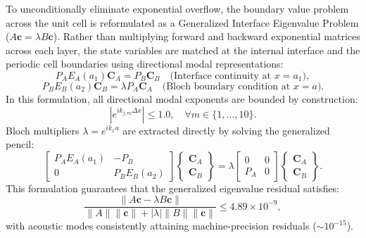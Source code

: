 \documentclass[11pt,a4paper]{article}
\begin{document}
To unconditionally eliminate exponential overflow, the boundary value problem across the unit cell is reformulated as a Generalized Interface Eigenvalue Problem ($A\mathbf{c} = \lambda B\mathbf{c}$). Rather than multiplying forward and backward exponential matrices across each layer, the state variables are matched at the internal interface and the periodic cell boundaries using directional modal representations:
\begin{equation}
P_A E_A(a_1) \mathbf{C}_A = P_B \mathbf{C}_B \quad \text{(Interface continuity at $x = a_1$)},
\label{eq:gep_interface}
\end{equation}
\begin{equation}
P_B E_B(a_2) \mathbf{C}_B = \lambda P_A \mathbf{C}_A \quad \text{(Bloch boundary condition at $x = a$)}.
\label{eq:gep_bloch}
\end{equation}
In this formulation, all directional modal exponents are bounded by construction:
\begin{equation}
\left| e^{i k_{j,m} \Delta x} \right| \le 1.0, \quad \forall m \in \{1, \dots, 10\}.
\end{equation}
Bloch multipliers $\lambda = e^{i k_x a}$ are extracted directly by solving the generalized pencil:
\begin{equation}
\begin{bmatrix}
P_A E_A(a_1) & -P_B \\
0 & P_B E_B(a_2)
\end{bmatrix}
\begin{Bmatrix} \mathbf{C}_A \\ \mathbf{C}_B \end{Bmatrix}
= \lambda
\begin{bmatrix}
0 & 0 \\
P_A & 0
\end{bmatrix}
\begin{Bmatrix} \mathbf{C}_A \\ \mathbf{C}_B \end{Bmatrix}.
\label{eq:generalized_pencil}
\end{equation}
This formulation guarantees that the generalized eigenvalue residual satisfies:
\begin{equation}
\frac{\|A\mathbf{c} - \lambda B\mathbf{c}\|}{\|A\|\|\mathbf{c}\| + |\lambda|\|B\|\|\mathbf{c}\|} \le 4.89 \times 10^{-9},
\end{equation}
with acoustic modes consistently attaining machine-precision residuals ($\sim 10^{-15}$).
\end{document}
